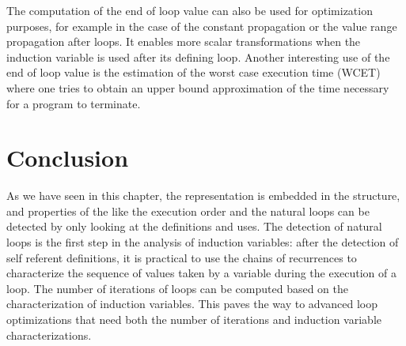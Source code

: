 The computation of the end of loop value can also be used for
optimization purposes, for example in the case of the constant
propagation or the value range propagation after loops.  It enables
more scalar transformations when the induction variable is used after
its defining loop.  Another interesting use of the end of loop value
is the estimation of the worst case execution time (WCET) where one
tries to obtain an upper bound approximation of the time necessary for
a program to terminate.

\section{Conclusion}
As we have seen in this chapter, the \CFG{} representation is embedded
in the \SSA{} structure, and properties of the \CFG{} like the
execution order and the natural loops can be detected by only looking
at the \SSA{} definitions and uses.  The detection of natural loops is
the first step in the analysis of induction variables: after the
detection of self referent definitions, it is practical to use the
chains of recurrences \cite{BWZ94,KMZ98,Zim01} to characterize the
sequence of values taken by a variable during the execution of a loop.
The number of iterations of loops can be computed based on the
characterization of induction variables.  This paves the way to
advanced loop optimizations that need both the number of iterations
and induction variable characterizations.

